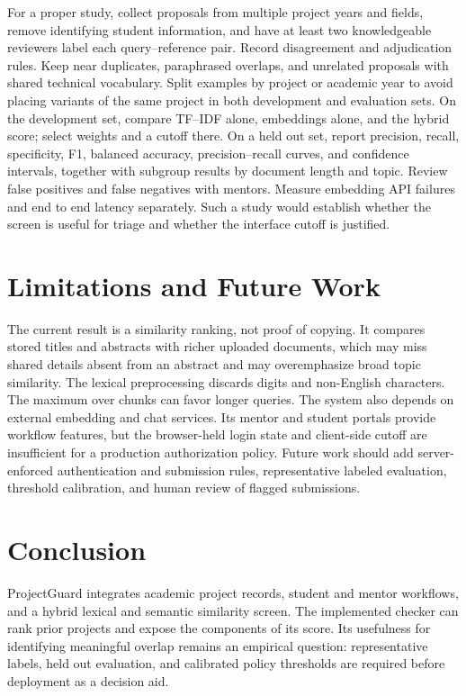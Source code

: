 \documentclass[conference]{IEEEtran}
\begin{document}
For a proper study, collect proposals from multiple project years and fields, remove identifying student information, and have at least two knowledgeable reviewers label each query--reference pair. Record disagreement and adjudication rules. Keep near duplicates, paraphrased overlaps, and unrelated proposals with shared technical vocabulary. Split examples by project or academic year to avoid placing variants of the same project in both development and evaluation sets. On the development set, compare TF--IDF alone, embeddings alone, and the hybrid score; select weights and a cutoff there. On a held out set, report precision, recall, specificity, F1, balanced accuracy, precision--recall curves, and confidence intervals, together with subgroup results by document length and topic. Review false positives and false negatives with mentors. Measure embedding API failures and end to end latency separately. Such a study would establish whether the screen is useful for triage and whether the interface cutoff is justified.

\section{Limitations and Future Work}
The current result is a similarity ranking, not proof of copying. It compares stored titles and abstracts with richer uploaded documents, which may miss shared details absent from an abstract and may overemphasize broad topic similarity. The lexical preprocessing discards digits and non-English characters. The maximum over chunks can favor longer queries. The system also depends on external embedding and chat services. Its mentor and student portals provide workflow features, but the browser-held login state and client-side cutoff are insufficient for a production authorization policy. Future work should add server-enforced authentication and submission rules, representative labeled evaluation, threshold calibration, and human review of flagged submissions.

\section{Conclusion}
ProjectGuard integrates academic project records, student and mentor workflows, and a hybrid lexical and semantic similarity screen. The implemented checker can rank prior projects and expose the components of its score. Its usefulness for identifying meaningful overlap remains an empirical question: representative labels, held out evaluation, and calibrated policy thresholds are required before deployment as a decision aid.
\end{document}
